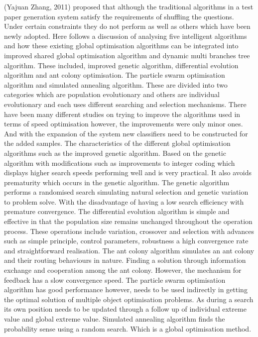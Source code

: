 (Yajuan Zhang, 2011) proposed that although the traditional algorithms in a test paper generation system satisfy the requirements of shuffling the questions. Under certain constraints they do not perform as well as others which have been newly adopted. Here follows a discussion of analysing five intelligent algorithms and how these existing global optimisation algorithms can be integrated into improved shared global optimisation algorithm and dynamic multi branches tree algorithm. These included, improved genetic algorithm, differential evolution algorithm and ant colony optimisation. The particle swarm optimisation algorithm and simulated annealing algorithm. These are divided into two categories which are population evolutionary and others are individual evolutionary and each uses different searching and selection mechanisms. There have been many different studies on trying to improve the algorithms used in terms of speed optimisation however, the improvements were only minor ones. And with the expansion of the system new classifiers need to be constructed for the added samples. The characteristics of the different global optimisation algorithms such as the improved genetic algorithm. Based on the genetic algorithm with modifications such as improvements to integer coding which displays higher search speeds performing well and is very practical. It also avoids prematurity which occurs in the genetic algorithm. The genetic algorithm performs a randomised search simulating natural selection and genetic variation to problem solve. With the disadvantage of having a low search efficiency with premature convergence. The differential evolution algorithm is simple and effective in that the population size remains unchanged throughout the operation process. These operations include variation, crossover and selection with advances such as simple principle, control parameters, robustness a high convergence rate and straightforward realisation. The ant colony algorithm simulates an ant colony and their routing behaviours in nature. Finding a solution through information exchange and cooperation among the ant colony. However, the mechanism for feedback has a slow convergence speed. The particle swarm optimisation algorithm has good performance however, needs to be used indirectly in getting the optimal solution of multiple object optimisation problems. As during a search its own position needs to be updated through a follow up of individual extreme value and global extreme value. Simulated annealing algorithm finds the probability sense using a random search. Which is a global optimisation method.
